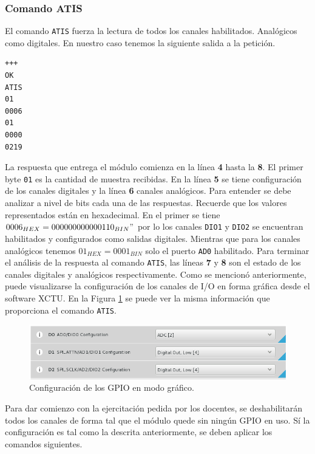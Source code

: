 \documentclass[11pt,oneside,spanish,a4paper]{article}
\begin{document}
\subsubsection{Comando ATIS}
\label{sec:atis}

El comando \texttt{ATIS} fuerza la lectura de todos los canales
habilitados. Analógicos como digitales. En nuestro caso tenemos la
siguiente salida a la petición.

\begin{lstlisting}[emph={+++,ATIS}, emphstyle={\color{blue}}]
+++
OK
ATIS
01
0006
01
0000
0219
\end{lstlisting}

La respuesta que entrega el módulo comienza en la línea \textbf{4}
hasta la \textbf{8}. El primer byte \texttt{01} es la cantidad de
muestra recibidas. En la línea \textbf{5} se tiene configuración de
los canales digitales y la línea \textbf{6} canales analógicos. Para
entender se debe analizar a nivel de bits cada una de las
respuestas. Recuerde que los valores representados están en
hexadecimal. En el primer se tiene $0006_{HEX} =
000000000000110_{BIN}"$ por lo los canales \texttt{DIO1} y
\texttt{DIO2} se encuentran habilitados y configurados como salidas
digitales. Mientras que para los canales analógicos tenemos
$01_{HEX} = 0001_{BIN}$ solo el puerto \texttt{AD0} habilitado. Para
terminar el análisis de la respuesta al comando \texttt{ATIS}, las
líneas \textbf{7} y \textbf{8} son el estado de los canales
digitales y analógicos respectivamente. Como se mencionó
anteriormente, puede visualizarse la configuración de los canales de
I/O en forma gráfica desde el software XCTU. En la Figura
\ref{fig:xctu-setup} se puede ver la misma información que
proporciona el comando \texttt{ATIS}.

\begin{figure}[ht]
  \centering
  \includegraphics[width=.8\textwidth]{img/xctu-atis}
  \caption{Configuración de los GPIO en modo gráfico.}
  \label{fig:xctu-setup}
\end{figure}

Para dar comienzo con la ejercitación pedida por los docentes, se
deshabilitarán todos los canales de forma tal que el módulo quede sin
ningún GPIO en uso. Sí la configuración es tal como la descrita
anteriormente, se deben aplicar los comandos siguientes.
\end{document}
